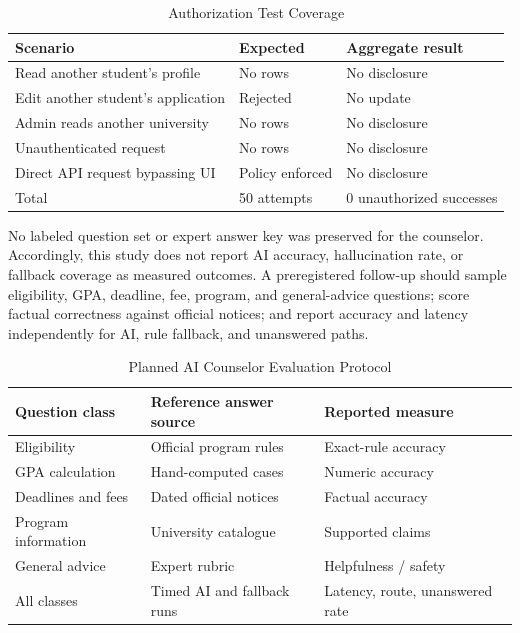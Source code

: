 \documentclass[conference,letterpaper]{IEEEtran}
\begin{document}
\begin{table}[!t]
\caption{Authorization Test Coverage}
\label{tab:security}
\centering\scriptsize
\setlength{\tabcolsep}{2pt}\renewcommand{\arraystretch}{1.04}
\begin{tabularx}{\columnwidth}{@{}X l l@{}}
\toprule
Scenario & Expected & Aggregate result\\
\midrule
Read another student's profile & No rows & No disclosure\\
Edit another student's application & Rejected & No update\\
Admin reads another university & No rows & No disclosure\\
Unauthenticated request & No rows & No disclosure\\
Direct API request bypassing UI & Policy enforced & No disclosure\\
\midrule
Total & 50 attempts & 0 unauthorized successes\\
\bottomrule
\end{tabularx}
\end{table}

No labeled question set or expert answer key was preserved for the counselor. Accordingly, this study does not report AI accuracy, hallucination rate, or fallback coverage as measured outcomes. A preregistered follow-up should sample eligibility, GPA, deadline, fee, program, and general-advice questions; score factual correctness against official notices; and report accuracy and latency independently for AI, rule fallback, and unanswered paths.

\begin{table}[!t]
\caption{Planned AI Counselor Evaluation Protocol}
\label{tab:ai-eval}
\centering\scriptsize
\setlength{\tabcolsep}{2pt}\renewcommand{\arraystretch}{1.04}
\begin{tabularx}{\columnwidth}{@{}l X l@{}}
\toprule
Question class & Reference answer source & Reported measure\\
\midrule
Eligibility & Official program rules & Exact-rule accuracy\\
GPA calculation & Hand-computed cases & Numeric accuracy\\
Deadlines and fees & Dated official notices & Factual accuracy\\
Program information & University catalogue & Supported claims\\
General advice & Expert rubric & Helpfulness / safety\\
\midrule
All classes & Timed AI and fallback runs & Latency, route, unanswered rate\\
\bottomrule
\end{tabularx}
\end{table}
\end{document}
